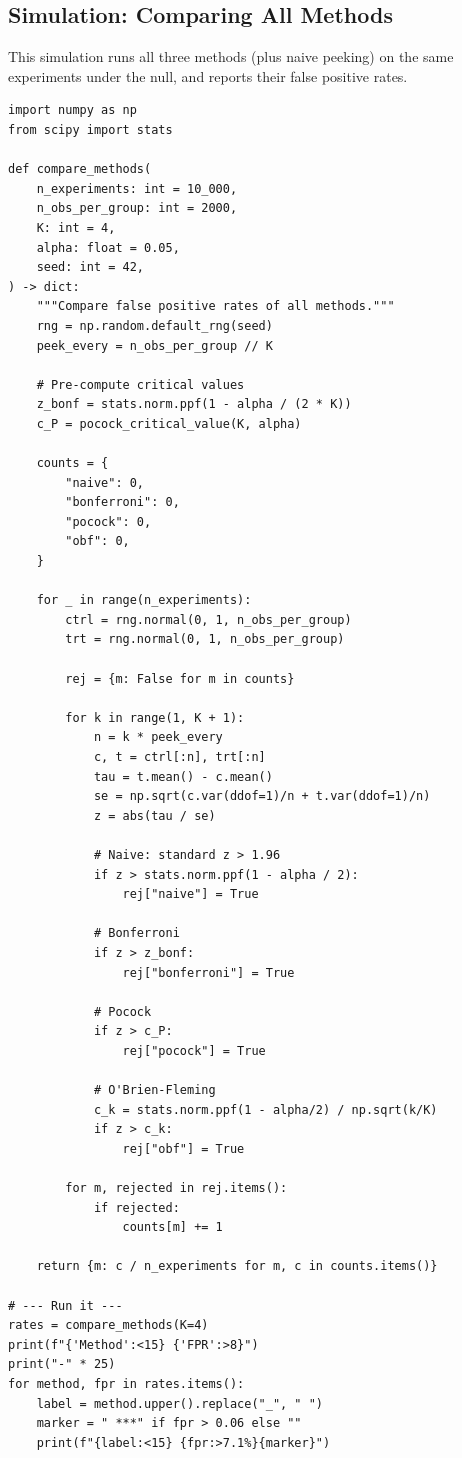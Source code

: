 \documentclass[12pt, a4paper]{article}
\begin{document}
\subsection{Simulation: Comparing All Methods}

This simulation runs all three methods (plus naive peeking) on the same
experiments under the null, and reports their false positive rates.

\begin{lstlisting}
import numpy as np
from scipy import stats

def compare_methods(
    n_experiments: int = 10_000,
    n_obs_per_group: int = 2000,
    K: int = 4,
    alpha: float = 0.05,
    seed: int = 42,
) -> dict:
    """Compare false positive rates of all methods."""
    rng = np.random.default_rng(seed)
    peek_every = n_obs_per_group // K

    # Pre-compute critical values
    z_bonf = stats.norm.ppf(1 - alpha / (2 * K))
    c_P = pocock_critical_value(K, alpha)

    counts = {
        "naive": 0,
        "bonferroni": 0,
        "pocock": 0,
        "obf": 0,
    }

    for _ in range(n_experiments):
        ctrl = rng.normal(0, 1, n_obs_per_group)
        trt = rng.normal(0, 1, n_obs_per_group)

        rej = {m: False for m in counts}

        for k in range(1, K + 1):
            n = k * peek_every
            c, t = ctrl[:n], trt[:n]
            tau = t.mean() - c.mean()
            se = np.sqrt(c.var(ddof=1)/n + t.var(ddof=1)/n)
            z = abs(tau / se)

            # Naive: standard z > 1.96
            if z > stats.norm.ppf(1 - alpha / 2):
                rej["naive"] = True

            # Bonferroni
            if z > z_bonf:
                rej["bonferroni"] = True

            # Pocock
            if z > c_P:
                rej["pocock"] = True

            # O'Brien-Fleming
            c_k = stats.norm.ppf(1 - alpha/2) / np.sqrt(k/K)
            if z > c_k:
                rej["obf"] = True

        for m, rejected in rej.items():
            if rejected:
                counts[m] += 1

    return {m: c / n_experiments for m, c in counts.items()}

# --- Run it ---
rates = compare_methods(K=4)
print(f"{'Method':<15} {'FPR':>8}")
print("-" * 25)
for method, fpr in rates.items():
    label = method.upper().replace("_", " ")
    marker = " ***" if fpr > 0.06 else ""
    print(f"{label:<15} {fpr:>7.1%}{marker}")
\end{lstlisting}
\end{document}
